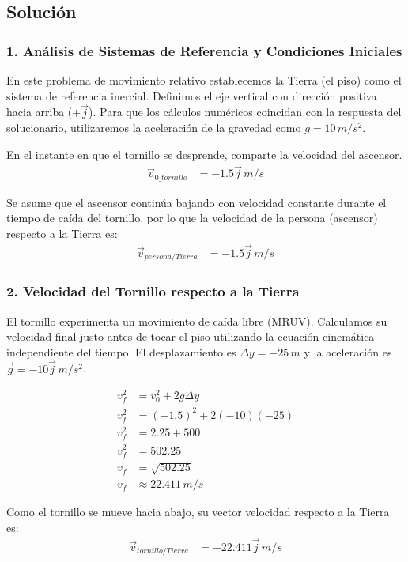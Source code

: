 \documentclass[12pt, a4paper]{article}
\begin{document}
\subsection*{Solución}

\subsubsection*{1. Análisis de Sistemas de Referencia y Condiciones Iniciales}
En este problema de movimiento relativo establecemos la Tierra (el piso) como el sistema de referencia inercial. Definimos el eje vertical con dirección positiva hacia arriba ($+\vec{j}$). Para que los cálculos numéricos coincidan con la respuesta del solucionario, utilizaremos la aceleración de la gravedad como $g = 10 \, \si{m/s^2}$.

En el instante en que el tornillo se desprende, comparte la velocidad del ascensor. 
\begin{align*}
\vec{v}_{0\_tornillo} &= -1.5\vec{j} \, \si{m/s}
\end{align*}

Se asume que el ascensor continúa bajando con velocidad constante durante el tiempo de caída del tornillo, por lo que la velocidad de la persona (ascensor) respecto a la Tierra es:
\begin{align*}
\vec{v}_{persona/Tierra} &= -1.5\vec{j} \, \si{m/s}
\end{align*}

\subsubsection*{2. Velocidad del Tornillo respecto a la Tierra}
El tornillo experimenta un movimiento de caída libre (MRUV). Calculamos su velocidad final justo antes de tocar el piso utilizando la ecuación cinemática independiente del tiempo. El desplazamiento es $\Delta y = -25 \, \si{m}$ y la aceleración es $\vec{g} = -10\vec{j} \, \si{m/s^2}$.

\begin{align*}
v_f^2 &= v_0^2 + 2g\Delta y \\
v_f^2 &= (-1.5)^2 + 2(-10)(-25) \\
v_f^2 &= 2.25 + 500 \\
v_f^2 &= 502.25 \\
v_f &= \sqrt{502.25} \\
v_f &\approx 22.411 \, \si{m/s}
\end{align*}

Como el tornillo se mueve hacia abajo, su vector velocidad respecto a la Tierra es:
\begin{align*}
\vec{v}_{tornillo/Tierra} &= -22.411\vec{j} \, \si{m/s}
\end{align*}
\end{document}
